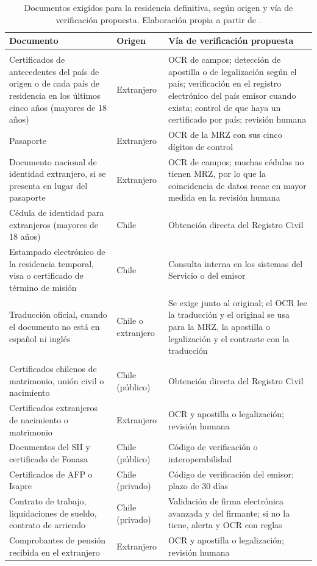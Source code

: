 \documentclass[11pt,a4paper]{article}
\begin{document}
\begin{table}[!htbp]
\centering
\caption{Documentos exigidos para la residencia definitiva, según origen y vía de verificación propuesta. Elaboración propia a partir de \cite{sermigrd}.}
\label{tab:requisitos}
\small
\begin{tabularx}{\textwidth}{>{\raggedright\arraybackslash}p{5.3cm} >{\raggedright\arraybackslash}p{2.3cm} L}
\toprule
\textbf{Documento} & \textbf{Origen} & \textbf{Vía de verificación propuesta} \\
\midrule
{} \\
Certificados de antecedentes del país de origen o de cada país de residencia en los últimos cinco años (mayores de 18 años) & Extranjero & OCR de campos; detección de apostilla o de legalización según el país; verificación en el registro electrónico del país emisor cuando exista; control de que haya un certificado por país; revisión humana \\
Pasaporte & Extranjero & OCR de la MRZ con sus cinco dígitos de control \\
Documento nacional de identidad extranjero, si se presenta en lugar del pasaporte & Extranjero & OCR de campos; muchas cédulas no tienen MRZ, por lo que la coincidencia de datos recae en mayor medida en la revisión humana \\
Cédula de identidad para extranjeros (mayores de 18 años) & Chile & Obtención directa del Registro Civil \\
Estampado electrónico de la residencia temporal, visa o certificado de término de misión & Chile & Consulta interna en los sistemas del Servicio o del emisor \\
Traducción oficial, cuando el documento no está en español ni inglés & Chile o extranjero & Se exige junto al original; el OCR lee la traducción y el original se usa para la MRZ, la apostilla o legalización y el contraste con la traducción \\
\midrule
{} \\
Certificados chilenos de matrimonio, unión civil o nacimiento & Chile (público) & Obtención directa del Registro Civil \\
Certificados extranjeros de nacimiento o matrimonio & Extranjero & OCR y apostilla o legalización; revisión humana \\
Documentos del SII y certificado de Fonasa & Chile (público) & Código de verificación o interoperabilidad \\
Certificados de AFP o Isapre & Chile (privado) & Código de verificación del emisor; plazo de 30 días \\
Contrato de trabajo, liquidaciones de sueldo, contrato de arriendo & Chile (privado) & Validación de firma electrónica avanzada y del firmante; si no la tiene, alerta y OCR con reglas \\
Comprobantes de pensión recibida en el extranjero & Extranjero & OCR y apostilla o legalización; revisión humana \\
\bottomrule
\end{tabularx}
\end{table}
\end{document}
